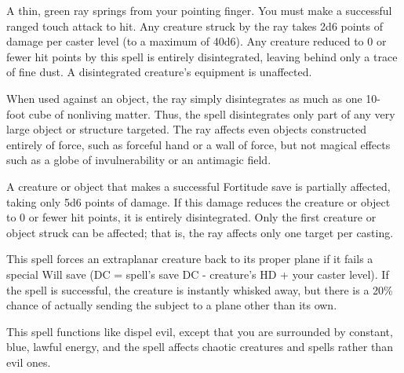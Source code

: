 \begin{multicols}{2}
\begin{small}
\noindent A thin, green ray springs from your pointing finger. You must make a successful ranged touch attack to hit. Any creature struck by the ray takes 2d6 points of damage per caster level (to a maximum of 40d6). Any creature reduced to 0 or fewer hit points by this spell is entirely disintegrated, leaving behind only a trace of fine dust. A disintegrated creature's equipment is unaffected.

\smallskip\noindent When used against an object, the ray simply disintegrates as much as one 10- foot cube of nonliving matter. Thus, the spell disintegrates only part of any very large object or structure targeted. The ray affects even objects constructed entirely of force, such as forceful hand or a wall of force, but not magical effects such as a globe of invulnerability or an antimagic field.

\smallskip\noindent A creature or object that makes a successful Fortitude save is partially affected, taking only 5d6 points of damage. If this damage reduces the creature or object to 0 or fewer hit points, it is entirely disintegrated.
Only the first creature or object struck can be affected; that is, the ray affects only one target per casting.


\noindent This spell forces an extraplanar creature back to its proper plane if it fails a special Will save (DC = spell's save DC - creature's HD + your caster level). If the spell is successful, the creature is instantly whisked away, but there is a 20\% chance of actually sending the subject to a plane other than its own.

\noindent This spell functions like dispel evil, except that you are surrounded by constant, blue, lawful energy, and the spell affects chaotic creatures and spells rather than evil ones.


\end{small}
\end{multicols}
